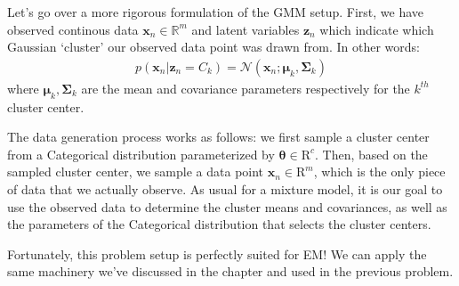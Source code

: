 Let's go over a more rigorous formulation of the GMM setup. First, we have observed continous data $\textbf{x}_n \in \mathbb{R}^{m}$ and latent variables $\textbf{z}_n$ which indicate which Gaussian `cluster' our observed data point was drawn from. In other words:
\begin{align*}
    p(\textbf{x}_n | \textbf{z}_n = C_k) = \mathcal{N}(\textbf{x}_n; \boldsymbol{\mu}_k, \boldsymbol{\Sigma}_k)
\end{align*}
where $\boldsymbol{\mu}_k, \boldsymbol{\Sigma}_k$ are the mean and covariance parameters respectively for the $k^{th}$ cluster center.

The data generation process works as follows: we first sample a cluster center from a Categorical distribution parameterized by $\boldsymbol{\theta} \in \mathrm{R}^{c}$. Then, based on the sampled cluster center, we sample a data point $\textbf{x}_n \in \mathrm{R}^{m}$, which is the only piece of data that we actually observe. As usual for a mixture model, it is our goal to use the observed data to determine the cluster means and covariances, as well as the parameters of the Categorical distribution that selects the cluster centers.

Fortunately, this problem setup is perfectly suited for EM! We can apply the same machinery we've discussed in the chapter and used in the previous problem.

